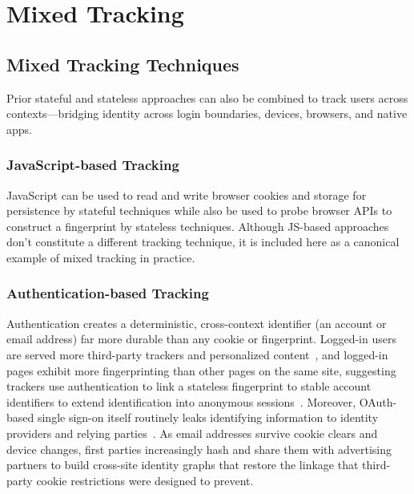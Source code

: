 \section{Mixed Tracking}
\label{sec:mixed-tracking}


\subsection{Mixed Tracking Techniques}
\label{sec:mixed-techniques}

Prior stateful and stateless approaches can also be combined to track users across contexts---bridging identity across login boundaries, devices, browsers, and native apps. 

\subsubsection{JavaScript-based Tracking}
\label{sec:mixed-techniques-js-tracking}

%
JavaScript can be used to read and write browser cookies and storage for persistence by stateful techniques while also be used to probe browser APIs to construct a fingerprint by stateless techniques.
%
Although JS-based approaches don't constitute a different tracking technique, it is included here as a canonical example of mixed tracking in practice.


\subsubsection{Authentication-based Tracking}
\label{sec:mixed-techniques-auth-tracking}

Authentication creates a deterministic, cross-context identifier (an account or email address) far more durable than any cookie or fingerprint.
%
Logged-in users are served more third-party trackers and personalized content~\cite{kaizerCharacterizingWebsiteBehaviors2016}, and logged-in pages exhibit more fingerprinting than other pages on the same site, suggesting trackers use authentication to link a stateless fingerprint to stable account identifiers to extend identification into anonymous sessions~\cite{senolDoubleEdgedSword2024}.
%
Moreover, OAuth-based single sign-on itself routinely leaks identifying information to identity providers and relying parties~\cite{dimovaEverybodysLookingSSOmething2023}.
%
As email addresses survive cookie clears and device changes, first parties increasingly hash and share them with advertising partners to build cross-site identity graphs that restore the linkage that third-party cookie restrictions were designed to prevent.


